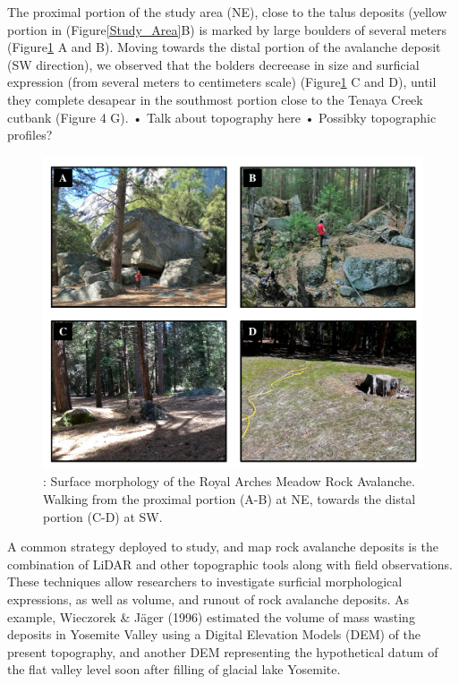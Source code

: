 \documentclass[5p]{elsarticle}
\begin{document}
The proximal portion of the study area (NE), close to the talus deposits (yellow portion in (Figure\ref{Study_Area}B) is marked by large boulders of several meters (Figure\ref{Study_Area2} A and B). Moving towards the distal portion of the avalanche deposit (SW direction), we observed that the bolders decreease in size and surficial expression (from several meters to centimeters scale) (Figure\ref{Study_Area2} C and D), until they complete desapear in the southmost portion close to the Tenaya Creek cutbank (Figure 4 G).
•	Talk about topography here
•	Possibky topographic profiles?

									\begin{figure}[h]

	\includegraphics[width=\textwidth]{Figures/Study_Area2.pdf}
		\caption{: Surface morphology of the Royal Arches Meadow Rock Avalanche. Walking from the proximal portion (A-B) at NE, towards the distal portion (C-D) at SW. \label{Study_Area2}}

									\end{figure}
			
A common strategy deployed to study, and map rock avalanche deposits is the combination of LiDAR and other topographic tools along with field observations. These techniques allow researchers to investigate surficial morphological expressions, as well as volume, and runout of rock avalanche deposits. As example, Wieczorek \& Jäger (1996) estimated the volume of mass wasting deposits in Yosemite Valley using  a Digital Elevation Models (DEM) of the present topography, and  another DEM representing the hypothetical datum of the flat valley level soon after filling of glacial lake Yosemite. 
\end{document}
